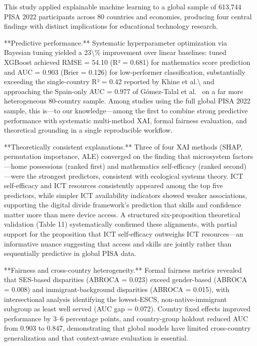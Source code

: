 \documentclass[pdflatex,sn-mathphys-ay]{sn-jnl}
\begin{document}
This study applied explainable machine learning to a global sample of 613,744 PISA 2022 participants across 80 countries and economies, producing four central findings with distinct implications for educational technology research.

**Predictive performance.** Systematic hyperparameter optimization via Bayesian tuning yielded a 23\textbackslash{}\% improvement over linear baselines: tuned XGBoost achieved RMSE = 54.10 (R² = 0.681) for mathematics score prediction and AUC = 0.903 (Brier = 0.126) for low-performer classification, substantially exceeding the single-country R² = 0.42 reported by Khine et al.\textbackslash{} \citep{Khine_2024} and approaching the Spain-only AUC = 0.977 of Gómez-Talal et al.\ \citep{Gomez_Talal_2025} on a far more heterogeneous 80-country sample. Among studies using the full global PISA 2022 sample, this is---to our knowledge---among the first to combine strong predictive performance with systematic multi-method XAI, formal fairness evaluation, and theoretical grounding in a single reproducible workflow.

**Theoretically consistent explanations.** Three of four XAI methods (SHAP, permutation importance, ALE) converged on the finding that microsystem factors---home possessions (ranked first) and mathematics self-efficacy (ranked second)---were the strongest predictors, consistent with ecological systems theory. ICT self-efficacy and ICT resources consistently appeared among the top five predictors, while simpler ICT availability indicators showed weaker associations, supporting the digital divide framework's prediction that skills and confidence matter more than mere device access. A structured six-proposition theoretical validation (Table 11) systematically confirmed these alignments, with partial support for the proposition that ICT self-efficacy outweighs ICT resources---an informative nuance suggesting that access and skills are jointly rather than sequentially predictive in global PISA data.

**Fairness and cross-country heterogeneity.** Formal fairness metrics revealed that SES-based disparities (ABROCA = 0.023) exceed gender-based (ABROCA = 0.008) and immigrant-background disparities (ABROCA = 0.015), with intersectional analysis identifying the lowest-ESCS, non-native-immigrant subgroup as least well served (AUC gap = 0.072). Country fixed effects improved performance by 3--6 percentage points, and country-group holdout reduced AUC from 0.903 to 0.847, demonstrating that global models have limited cross-country generalization and that context-aware evaluation is essential.
\end{document}
